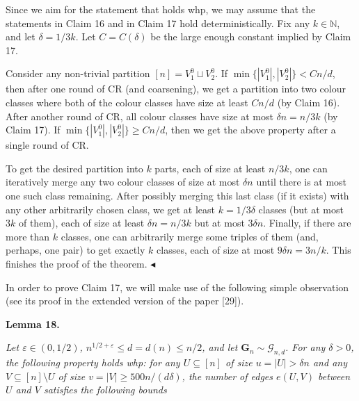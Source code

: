 \documentclass[10pt,a4paper]{article}
\begin{document}
Since we aim for the statement that holds whp, we may assume that the statements in Claim 16 and in Claim 17 hold deterministically. Fix any $k\in\mathbb{N}$, and let $\delta=1/3k$. Let $C=C(\delta)$ be the large enough constant implied by Claim 17.\par




Consider any non-trivial partition $[n]=V_{1}^{0}\sqcup V_{2}^{0}$. If $\min\{|V_{1}^{0}|,|V_{2}^{0}|\}<Cn/d$, then after one round of CR (and coarsening), we get a partition into two colour classes where both of the colour classes have size at least $Cn/d$ (by Claim 16). After another round of CR, all colour classes have size at most $\delta n=n/3k$ (by Claim 17). If $\min\{|V_{1}^{0}|,|V_{2}^{0}|\}\geq Cn/d$, then we get the above property after a single round of CR.\par




To get the desired partition into $k$ parts, each of size at least $n/3k$, one can iteratively merge any two colour classes of size at most $\delta n$ until there is at most one such class remaining. After possibly merging this last class (if it exists) with any other arbitrarily chosen class, we get at least $k=1/3\delta$ classes (but at most $3k$ of them), each of size at least $\delta n=n/3k$ but at most $3\delta n$. Finally, if there are more than $k$ classes, one can arbitrarily merge some triples of them (and, perhaps, one pair) to get exactly $k$ classes, each of size at most $9\delta n=3n/k$. This finishes the proof of the theorem.
$\blacktriangleleft$\par




In order to prove Claim 17, we will make use of the following simple observation (see its proof in the extended version of the paper [29]).\par





\par\medskip\noindent\textbf{
\textbf{Lemma 18}\textbf{.}
}\par



\emph{Let $\varepsilon\in(0,1/2)$, $n^{1/2+\varepsilon}\leq d=d(n)\leq n/2$, and let $\mathbf{G}_{n}\sim\mathcal{G}_{n,d}$.
For any $\delta>0$, the following property holds whp: for any $U\subseteq[n]$ of size $u=|U|>\delta n$ and any $V\subseteq[n]\setminus U$ of size $v=|V|\geq 500n/(d\delta)$, the number of edges $e(U,V)$ between $U$ and $V$ satisfies the following bounds}\par
\end{document}
